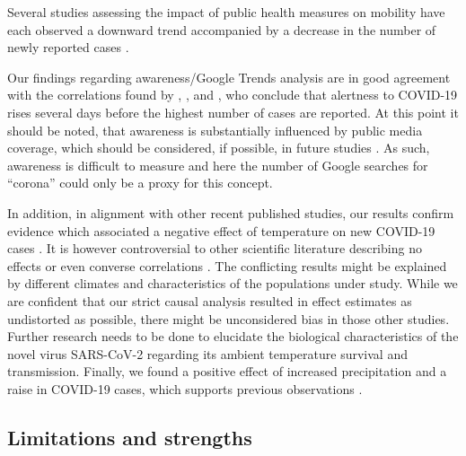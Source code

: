 \documentclass[]{elsarticle} %
\begin{document}
Several studies assessing the impact of public health measures on mobility have each observed a downward trend accompanied by a decrease in the number of newly reported cases \citep{chang_modeling_2020, cowling2020impact, fowler_effect_2020, kraemer_effect_2020, lai_effect_2020, linka_outbreak_2020}.

Our findings regarding awareness/Google Trends analysis are in good agreement with the correlations found by \citet{effenberger_association_2020}, \citet{higgins_correlations_2020}, and \citet{yuan_trends_2020}, who conclude that alertness to COVID-19 rises several days before the highest number of cases are reported. At this point it should be noted, that awareness is substantially influenced by public media coverage, which should be considered, if possible, in future studies \citep{higgins_correlations_2020}. As such, awareness is difficult to measure and here the number of Google searches for ``corona'' could only be a proxy for this concept.

In addition, in alignment with other recent published studies, our results confirm evidence which associated a negative effect of temperature on new COVID-19 cases \citep{bannister-tyrrell_preliminary_2020, demongeot_temperature_2020, liu_impact_2020, qi_covid-19_2020, shi_impact_2020, sobral_association_2020, tosepu_correlation_2020, Wang2020temperature, wu_effects_2020}. It is however controversial to other scientific literature describing no effects \citep{briz-redon_spatio-temporal_2020, iqbal_nexus_2020, jahangiri_sensitivity_2020, juni_impact_2020, yao_no_2020} or even converse correlations \citep{auler_evidence_2020, xie_association_2020}. The conflicting results might be explained by different climates and characteristics of the populations under study. While we are confident that our strict causal analysis resulted in effect estimates as undistorted as possible, there might be unconsidered bias in those other studies. Further research needs to be done to elucidate the biological characteristics of the novel virus SARS-CoV-2 regarding its ambient temperature survival and transmission. Finally, we found a positive effect of increased precipitation and a raise in COVID-19 cases, which supports previous observations \citep{sobral_association_2020}.

\hypertarget{limitations-and-strengths}{%
\subsection{Limitations and strengths}\label{limitations-and-strengths}}
\end{document}
